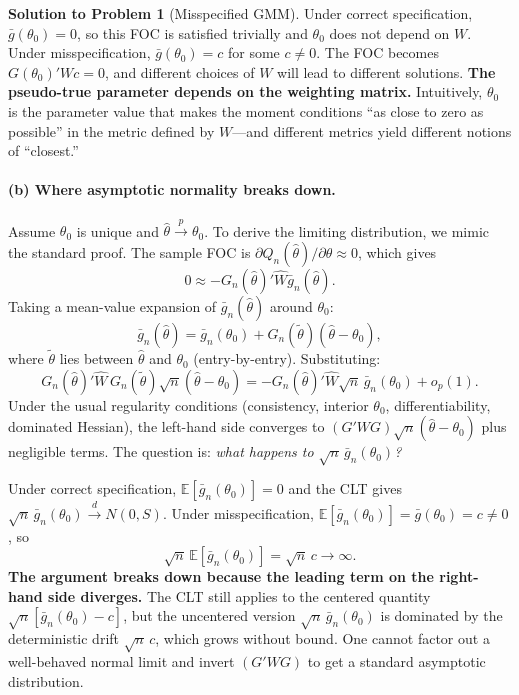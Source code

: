 \documentclass[12pt]{article}
\newcommand{\E}{\mathbb E}
\theoremstyle{definition}
\newtheorem{solution}{Solution to Problem}
\begin{document}
\begin{solution}[Misspecified GMM]
Under correct specification, $\bar{g}(\theta_0)=0$, so this FOC is satisfied trivially and $\theta_0$ does not depend on $W$. Under misspecification, $\bar{g}(\theta_0)=c$ for some $c\neq 0$. The FOC becomes $G(\theta_0)'Wc=0$, and different choices of $W$ will lead to different solutions. \textbf{The pseudo-true parameter depends on the weighting matrix.} Intuitively, $\theta_0$ is the parameter value that makes the moment conditions ``as close to zero as possible'' in the metric defined by $W$---and different metrics yield different notions of ``closest.''

\bigskip
\paragraph{(b) Where asymptotic normality breaks down.} Assume $\theta_0$ is unique and $\hat\theta\xrightarrow{p}\theta_0$. To derive the limiting distribution, we mimic the standard proof. The sample FOC is $\partial Q_n(\hat\theta)/\partial\theta\approx 0$, which gives
\[
0 \approx -G_n(\hat\theta)'\hat{W}\bar{g}_n(\hat\theta).
\]
Taking a mean-value expansion of $\bar{g}_n(\hat\theta)$ around $\theta_0$:
\[
\bar{g}_n(\hat\theta) = \bar{g}_n(\theta_0) + G_n(\tilde\theta)(\hat\theta-\theta_0),
\]
where $\tilde\theta$ lies between $\hat\theta$ and $\theta_0$ (entry-by-entry). Substituting:
\[
G_n(\hat\theta)'\hat{W}\,G_n(\tilde\theta)\sqrt{n}(\hat\theta-\theta_0) = -G_n(\hat\theta)'\hat{W}\sqrt{n}\,\bar{g}_n(\theta_0) + o_p(1).
\]
Under the usual regularity conditions (consistency, interior $\theta_0$, differentiability, dominated Hessian), the left-hand side converges to $(G'WG)\sqrt{n}(\hat\theta-\theta_0)$ plus negligible terms. The question is: \emph{what happens to $\sqrt{n}\,\bar{g}_n(\theta_0)$?}

Under correct specification, $\E[\bar{g}_n(\theta_0)]=0$ and the CLT gives $\sqrt{n}\,\bar{g}_n(\theta_0)\xrightarrow{d}N(0,S)$. Under misspecification, $\E[\bar{g}_n(\theta_0)]=\bar{g}(\theta_0)=c\neq 0$, so
\[
\sqrt{n}\,\E[\bar{g}_n(\theta_0)] = \sqrt{n}\,c \to \infty.
\]
\textbf{The argument breaks down because the leading term on the right-hand side diverges.} The CLT still applies to the centered quantity $\sqrt{n}[\bar{g}_n(\theta_0)-c]$, but the uncentered version $\sqrt{n}\,\bar{g}_n(\theta_0)$ is dominated by the deterministic drift $\sqrt{n}\,c$, which grows without bound. One cannot factor out a well-behaved normal limit and invert $(G'WG)$ to get a standard asymptotic distribution.

\bigskip

\end{solution}
\end{document}
